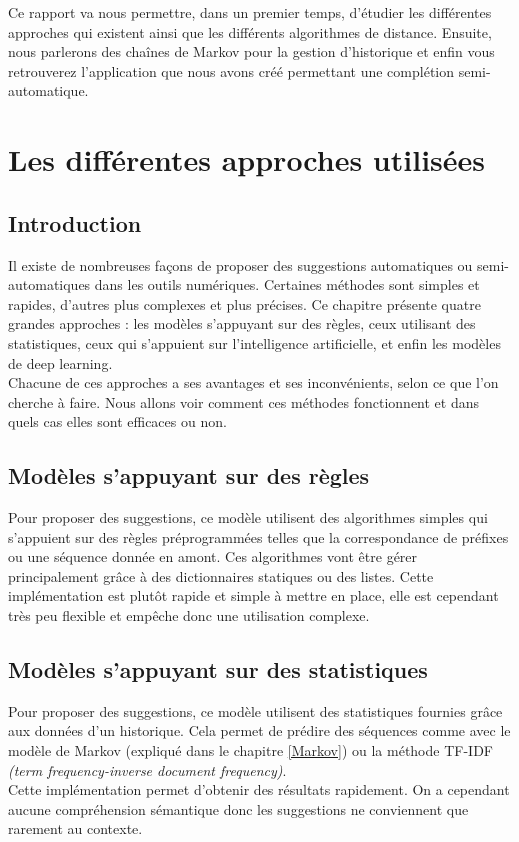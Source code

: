 \documentclass[a4paper, 11pt]{report}
\begin{document}
Ce rapport va nous permettre, dans un premier temps, d’étudier les différentes approches qui existent ainsi que  les différents algorithmes de distance. Ensuite, nous parlerons  des chaînes de Markov pour la gestion d'historique et enfin vous retrouverez l'application que nous avons créé permettant une complétion semi-automatique.\par
\vfill

\chapter{Les différentes approches utilisées}

\section{Introduction}

Il existe de nombreuses façons de proposer des suggestions automatiques ou semi-automatiques dans les outils numériques. Certaines méthodes sont simples et rapides, d’autres plus complexes et plus précises. Ce chapitre présente quatre grandes approches : les modèles s'appuyant sur des règles, ceux utilisant des statistiques, ceux qui s’appuient sur l’intelligence artificielle, et enfin les modèles de deep learning. \\

Chacune de ces approches a ses avantages et ses inconvénients, selon ce que l’on cherche à faire. Nous allons voir comment ces méthodes fonctionnent et dans quels cas elles sont efficaces ou non.

\section{Modèles s'appuyant sur des règles}
Pour proposer des suggestions, ce modèle utilisent des algorithmes simples qui s'appuient sur des règles préprogrammées telles que la correspondance de préfixes ou une séquence donnée en amont. Ces algorithmes vont être gérer principalement grâce à des dictionnaires statiques ou des listes.  Cette implémentation est plutôt rapide et simple à mettre en place, elle est cependant très peu flexible et empêche donc une utilisation complexe.

\section{Modèles s'appuyant sur des statistiques}
Pour proposer des suggestions, ce modèle utilisent des statistiques fournies grâce aux données d'un historique. Cela permet de prédire des séquences comme avec le modèle de Markov (expliqué dans le chapitre \ref{Markov}) ou la méthode TF-IDF \textit{(term frequency-inverse document frequency)}.\\
Cette implémentation permet d'obtenir des résultats rapidement. On a cependant aucune compréhension sémantique donc les suggestions ne conviennent que rarement au contexte.
\newpage
\end{document}
